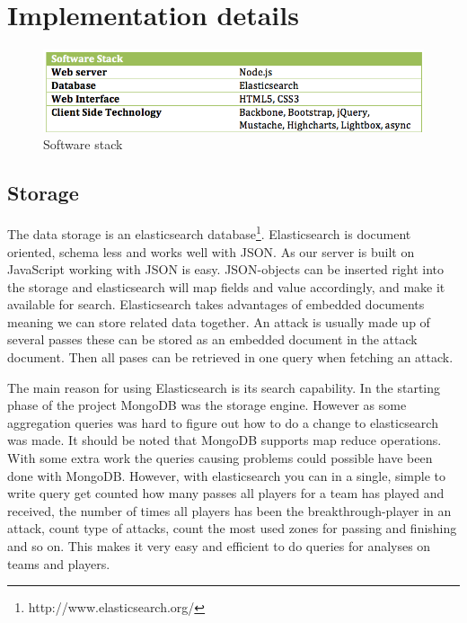 \section{Implementation details}

\begin{figure}[ht!]
\centering
\includegraphics[width=1\textwidth]{images/implementation/software_stack.png}
\caption{Software stack}
\end{figure}

\subsection{Storage}

The data storage is an elasticsearch database\footnote{http://www.elasticsearch.org/}. Elasticsearch is document oriented, schema less and works well with JSON\footnotemark. As our server is built on JavaScript working with JSON is easy. JSON-objects can be inserted right into the storage and elasticsearch will map fields and value accordingly, and make it available for search.
Elasticsearch takes advantages of embedded documents meaning we can store related data together. An attack is usually made up of several passes these can be stored as an embedded document in the attack document. Then all pases can be retrieved in one query when fetching an attack.

The main reason for using Elasticsearch is its search capability. In the starting phase of the project MongoDB \footnotemark was the storage engine. However as some aggregation queries was hard to figure out how to do a change to elasticsearch was made. It should be noted that MongoDB supports map reduce operations. With some extra work the queries causing problems could possible have been done with MongoDB. However, with elasticsearch you can in a single, simple to write query get counted how many passes all players for a team has played and received, the number of times all players has been the breakthrough-player in an attack, count type of attacks, count the most used zones for passing and finishing and so on. This makes it very easy and efficient to do queries for analyses on teams and players.


